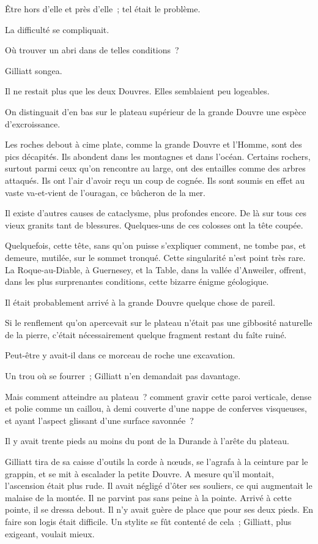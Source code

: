 \documentclass[french,twoside]{book} %
\begin{document}
Être hors d’elle et près d’elle ; tel était le problème.\par
La difficulté se compliquait.\par
Où trouver un abri dans de telles conditions ?\par
Gilliatt songea.\par
Il ne restait plus que les deux Douvres. Elles semblaient peu logeables.\par
On distinguait d’en bas sur le plateau supérieur de la grande Douvre une espèce d’excroissance.\par
Les roches debout à cime plate, comme la grande  Douvre et l’Homme, sont des pics décapités. Ils abondent dans les montagnes et dans l’océan. Certains rochers, surtout parmi ceux qu’on rencontre au large, ont des entailles comme des arbres attaqués. Ils ont l’air d’avoir reçu un coup de cognée. Ils sont soumis en effet au vaste va-et-vient de l’ouragan, ce bûcheron de la mer.\par
Il existe d’autres causes de cataclysme, plus profondes encore. De là sur tous ces vieux granits tant de blessures. Quelques-uns de ces colosses ont la tête coupée.\par
Quelquefois, cette tête, sans qu’on puisse s’expliquer comment, ne tombe pas, et demeure, mutilée, sur le sommet tronqué. Cette singularité n’est point très rare. La Roque-au-Diable, à Guernesey, et la Table, dans la vallée d’Anweiler, offrent, dans les plus surprenantes conditions, cette bizarre énigme géologique.\par
Il était probablement arrivé à la grande Douvre quelque chose de pareil.\par
Si le renflement qu’on apercevait sur le plateau n’était pas une gibbosité naturelle de la pierre, c’était nécessairement quelque fragment restant du faîte ruiné.\par
Peut-être y avait-il dans ce morceau de roche une excavation.\par
Un trou où se fourrer ; Gilliatt n’en demandait pas davantage.\par
Mais comment atteindre au plateau ? comment gravir cette paroi verticale, dense et polie comme un caillou, à demi couverte d’une nappe de conferves visqueuses, et ayant l’aspect glissant d’une surface savonnée ?\par
 Il y avait trente pieds au moins du pont de la Durande à l’arête du plateau.\par
Gilliatt tira de sa caisse d’outils la corde à nœuds, se l’agrafa à la ceinture par le grappin, et se mit à escalader la petite Douvre. A mesure qu’il montait, l’ascension était plus rude. Il avait négligé d’ôter ses souliers, ce qui augmentait le malaise de la montée. Il ne parvint pas sans peine à la pointe. Arrivé à cette pointe, il se dressa debout. Il n’y avait guère de place que pour ses deux pieds. En faire son logis était difficile. Un stylite se fût contenté de cela ; Gilliatt, plus exigeant, voulait mieux.\par
\end{document}
